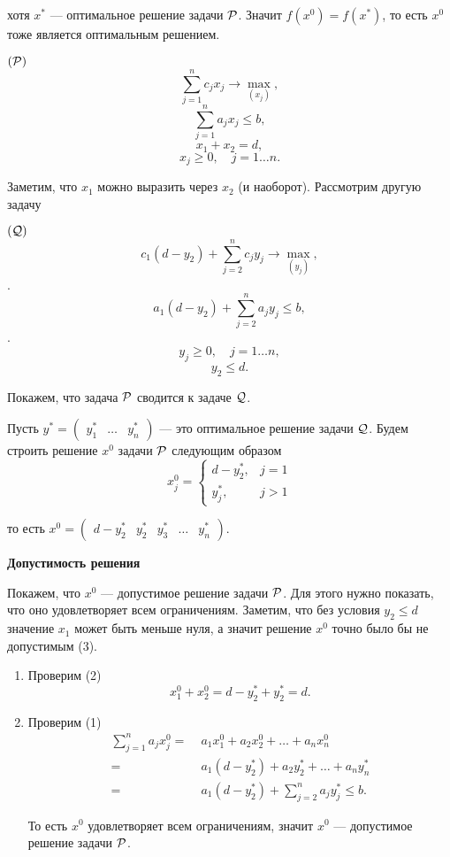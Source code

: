 хотя $x^*$ --- оптимальное решение задачи $\P$. Значит $f(x^0) = f(x^*)$, то есть $x^0$ тоже является оптимальным решением.

\example\label{ex:reduction_to_other_problem}

$(\P)$
\[\sum_{j=1}^{n} c_j x_j \to \max_{(x_j)},\]
\[\sum_{j=1}^{n} a_j x_j \le b \tag{1},\]
\[x_1 + x_2 = d \tag{2},\]
\[x_j \ge 0, \quad j = 1\dots n. \tag{3}\]

Заметим, что $x_1$ можно выразить через $x_2$ (и наоборот). Рассмотрим другую задачу

$(\Q)$
\[c_1(d - y_2) + \sum_{j=2}^{n} c_j y_j \to \max_{(y_j)},\].
\[a_1 (d-y_2) + \sum_{j=2}^{n}a_j y_j \le b,\].
\[y_j \ge 0, \quad j = 1\dots n,\]
\[y_2 \le d.\]

Покажем, что задача $\P$ сводится к задаче $\Q$.

\prooof

Пусть $y^* = \begin{pmatrix} y^*_1 & \dots & y^*_n \end{pmatrix}$ --- это оптимальное решение задачи $\Q$. Будем строить решение $x^0$ задачи $\P$ следующим образом
\[
x^0_j = \begin{cases}
	d - y_2^*,& j = 1 \\
	y_j^*,& j > 1
\end{cases}
\]

то есть $x^0 = \begin{pmatrix} d - y_2^* & y_2^* & y_3^* & \dots & y_n^* \end{pmatrix}$.

\bigskip

\textbf{Допустимость решения}

Покажем, что $x^0$ --- допустимое решение задачи $\P$. Для этого нужно показать, что оно удовлетворяет всем ограничениям. Заметим, что без условия $y_2 \le d$ значение $x_1$ может быть меньше нуля, а значит решение $x^0$ точно было бы не допустимым (3).

\begin{enumerate}[nosep]
	\item Проверим (2)
	\[
	x^0_1 + x^0_2 = d - y^*_2 + y^*_2 = d.
	\]
	
	\item Проверим (1)
	\begin{align*}
		\sum_{j=1}^{n} a_j x^0_j =& \; a_1 x^0_1 + a_2 x^0_2 + \dots + a_n x^0_n \\
		=& \; a_1 (d - y^*_2) + a_2 y^*_2 + \dots + a_n y^*_n \\
		=& \; a_1 (d-y^*_2) + \sum_{j=2}^{n}a_j y^*_j \le b.
	\end{align*}
	
	То есть $x^0$ удовлетворяет всем ограничениям, значит $x^0$ --- допустимое решение задачи $\P$.
\end{enumerate}

